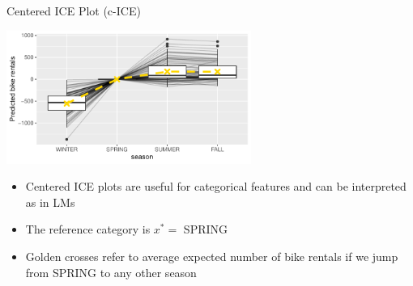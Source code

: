 \documentclass[11pt,compress,t,notes=noshow, aspectratio=169, xcolor=table]{beamer}
\begin{document}
\begin{frame}{Centered ICE Plot (c-ICE)}

\begin{center}
\includegraphics[width=0.6\textwidth]{figure/cICEcat}
\end{center}

\begin{itemize}
\item Centered ICE plots are useful for categorical features and can be interpreted as in LMs
\item The reference category is $x^* =$ SPRING
\item Golden crosses refer to average expected number of bike rentals if we jump from SPRING to any other season
\end{itemize}

\end{frame}


%
%


\end{document}
